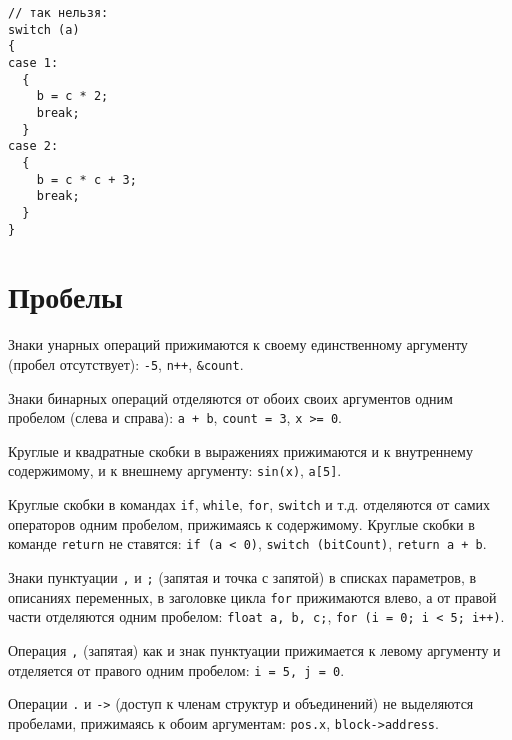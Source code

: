 \begin{verbatim}
// так нельзя:
switch (a)
{
case 1:
  {
    b = c * 2;
    break;
  }
case 2:
  {
    b = c * c + 3;
    break;
  }
}
\end{verbatim}


\section{Пробелы}


\zzstyleitem

Знаки унарных операций прижимаются к своему единственному аргументу
(пробел отсутствует): \texttt{-5}, \texttt{n++}, \texttt{\&count}.

\zzstyleitem

Знаки бинарных операций отделяются от обоих своих аргументов одним
пробелом (слева и справа): \texttt{a\ +\ b}, \texttt{count\ =\ 3},
\texttt{x\ \textgreater{}=\ 0}.

\zzstyleitem

Круглые и квадратные скобки в выражениях прижимаются и к внутреннему
содержимому, и к внешнему аргументу: \texttt{sin(x)}, \texttt{a{[}5{]}}.

\zzstyleitem

Круглые скобки в командах \texttt{if}, \texttt{while}, \texttt{for},
\texttt{switch} и т.д. отделяются от самих операторов одним пробелом,
прижимаясь к содержимому. Круглые скобки в команде \texttt{return} не
ставятся: \texttt{if\ (a\ \textless{}\ 0)}, \texttt{switch\ (bitCount)},
\texttt{return\ a\ +\ b}.

\zzstyleitem

Знаки пунктуации \texttt{,} и \texttt{;} (запятая и точка с запятой) в
списках параметров, в описаниях переменных, в заголовке цикла
\texttt{for} прижимаются влево, а от правой части отделяются одним
пробелом: \texttt{float\ a,\ b,\ c;},
\texttt{for\ (i\ =\ 0;\ i\ \textless{}\ 5;\ i++)}.

\zzstyleitem

Операция \texttt{,} (запятая) как и знак пунктуации прижимается к левому
аргументу и отделяется от правого одним пробелом:
\texttt{i\ =\ 5,\ j\ =\ 0}.

\zzstyleitem

Операции \texttt{.} и \texttt{-\textgreater{}} (доступ к членам структур
и объединений) не выделяются пробелами, прижимаясь к обоим аргументам:
\texttt{pos.x}, \texttt{block-\textgreater{}address}.

